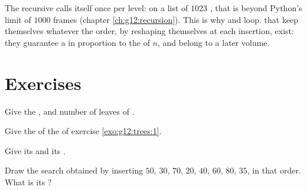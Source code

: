 \label{lst:g12:trees:degenerate}

\label{out:g12:trees:degenerate}

The recursive  calls itself once per level: on a list of $1023$ , that is beyond Python's limit of
$1000$ frames (chapter \ref{ch:g12:recursion}). This is why  and  loop.  that keep
themselves  whatever the order, by reshaping themselves at each insertion, exist: they guarantee a  in
proportion to the  of $n$, and belong to a later volume.

\section{Exercises}\label{sec:g12:trees:exercises}

\begin{exercise}[$\star$]\label{exo:g12:trees:1}
Give the ,  and number of leaves of
.
\end{exercise}

\begin{exercise}[$\star$]\label{exo:g12:trees:2}
Give the  of the  of exercise \ref{exo:g12:trees:1}.
\end{exercise}

\begin{exercise}[$\star$]\label{exo:g12:trees:3}
Give its  and its .
\end{exercise}

\begin{exercise}[$\star$]\label{exo:g12:trees:4}
Draw the search  obtained by inserting $50$, $30$, $70$, $20$, $40$, $60$, $80$, $35$, in that order. What is its
?
\end{exercise}

